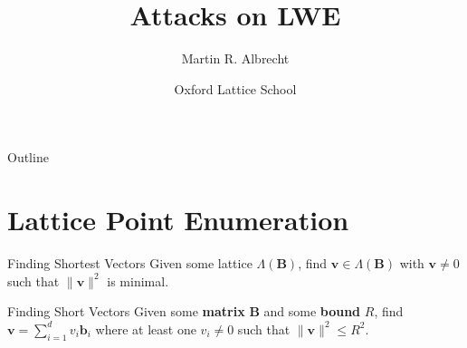 \documentclass[presentation,smaller]{beamer}
\author{Martin R. Albrecht}
\date{Oxford Lattice School}
\title{Attacks on LWE}
\renewcommand{\vec}[1]{\mathbf{#1}\xspace}
\newcommand{\mat}[1]{\mathbf{#1}\xspace}
\begin{document}
\maketitle
\begin{frame}{Outline}
\tableofcontents
\end{frame}


\section{Lattice Point Enumeration}
\label{sec:orgae5f98c}
\begin{frame}[label={sec:org55ec5b9}]{Finding Shortest Vectors}
Given some lattice \(Λ(\mat{B})\), find \(\vec{v} \in Λ(\mat{B})\) with \(\vec{v} \neq 0\) such that \(\|\vec{v}\|^2\) is minimal.
\end{frame}

\begin{frame}[label={sec:org355fcb4}]{Finding Short Vectors}
Given some \textbf{matrix} \(\mat{B}\) and some \textbf{bound} \(R\), find \(\vec{v} = \sum_{i=1}^{d} v_i \vec{b}_i\) where at least one \(v_i \neq 0\) such that \(\|\vec{v}\|^2 \leq R^2\).
\end{frame}
\end{document}
